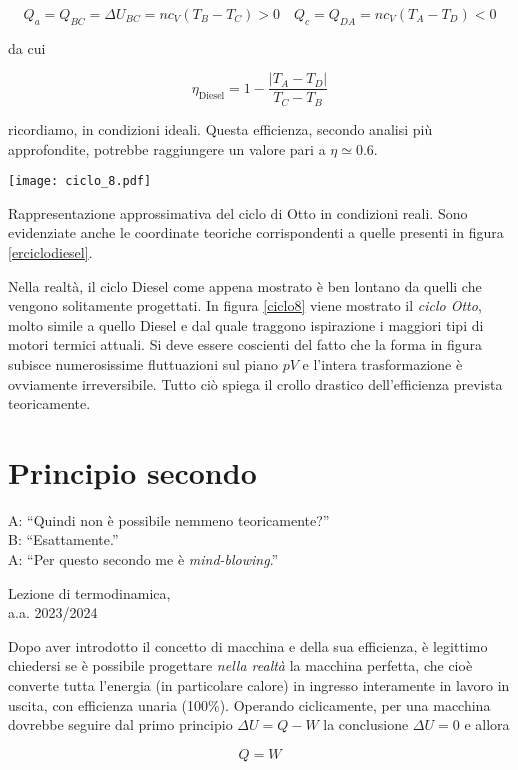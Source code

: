 \[ Q_a = Q_{BC} = \Delta U_{BC} = nc_V(T_B - T_C) > 0 \quad Q_c = Q_{DA} = nc_V(T_A - T_D) < 0 \]

\noindent da cui

\[ \eta_\text{Diesel} = 1 - \frac{|T_A - T_D|}{T_C - T_B} \]

\noindent ricordiamo, in condizioni ideali. Questa efficienza,
secondo analisi più approfondite, potrebbe raggiungere un
valore pari a $\eta \simeq 0.6$.

\begin{marginfigure}
    \centering
    \texttt{[image: ciclo\_8.pdf]}
    \caption{Rappresentazione approssimativa del ciclo di Otto in
    condizioni reali. Sono evidenziate anche le coordinate teoriche
    corrispondenti a quelle presenti in figura \ref{erciclodiesel}.}
    \label{ciclo8}
\end{marginfigure}

Nella realtà, il ciclo Diesel come appena mostrato è ben lontano
da quelli che vengono solitamente progettati. In figura \ref{ciclo8}
viene mostrato il \textit{ciclo Otto}, molto simile a quello Diesel
e dal quale traggono ispirazione i maggiori tipi di motori termici
attuali. Si deve essere coscienti del fatto che la forma in figura
subisce numerosissime fluttuazioni sul piano $pV$ e l'intera trasformazione
è ovviamente irreversibile. Tutto ciò spiega il crollo drastico
dell'efficienza prevista teoricamente.






\section{Principio secondo}
\epigraph{A: ``Quindi non è possibile nemmeno teoricamente?''\\B: ``Esattamente.''\\A: ``Per questo secondo me è \emph{mind-blowing}.''}{Lezione di termodinamica,\\a.a. 2023/2024}

Dopo aver introdotto il concetto di macchina e della sua efficienza,
è legittimo chiedersi se è possibile progettare \textit{nella realtà}
la macchina perfetta, che cioè converte tutta l'energia
(in particolare calore) in ingresso interamente in lavoro in uscita,
con efficienza unaria (100\%).
Operando ciclicamente, per una macchina dovrebbe seguire dal primo
principio $\Delta U = Q - W$ la conclusione $\Delta U = 0$ e allora

\[ Q = W \]

